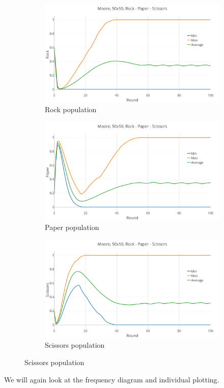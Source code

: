 \documentclass[a4paper, 11pt]{article}
\begin{document}
\begin{landscape}
\begin{figure}[H]
	\begin{subfigure}{0.53\textwidth}
		\includegraphics[width=1\linewidth]{50x50_60RockDist_Rock}
		\caption{Rock population}
	\end{subfigure}%
	\begin{subfigure}{0.53\textwidth}
		\includegraphics[width=1\linewidth]{50x50_60RockDist_Paper}
		\caption{Paper population}
	\end{subfigure}%
	\begin{subfigure}{0.53\textwidth}
		\includegraphics[width=1\linewidth]{50x50_60RockDist_Scissors}
		\caption{Scissors population}
	\end{subfigure}
\end{figure}

We will again look at the frequency diagram and individual plotting.
\end{landscape}
\newpage
\end{document}
